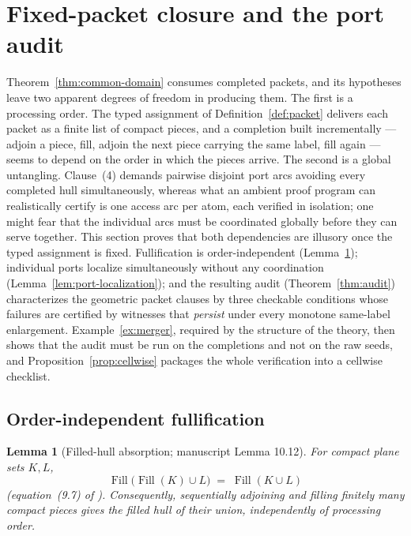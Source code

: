 \documentclass[11pt,reqno]{amsart}
\newtheorem{lemma}[theorem]{Lemma}
\theoremstyle{definition}
\theoremstyle{remark}
\newcommand{\Fill}{\operatorname{Fill}}
\begin{document}

\section{Fixed-packet closure and the port audit}\label{sec:audit}

Theorem~\ref{thm:common-domain} consumes completed packets, and its hypotheses leave
two apparent degrees of freedom in producing them. The first is a processing order.
The typed assignment of Definition~\ref{def:packet} delivers each packet as a finite
list of compact pieces, and a completion built incrementally --- adjoin a piece, fill,
adjoin the next piece carrying the same label, fill again --- seems to depend on the
order in which the pieces arrive. The second is a global untangling. Clause~(4)
demands pairwise disjoint port arcs avoiding every completed hull simultaneously,
whereas what an ambient proof program can realistically certify is one access arc per
atom, each verified in isolation; one might fear that the individual arcs must be
coordinated globally before they can serve together. This section proves that both
dependencies are illusory once the typed assignment is fixed. Fullification is
order-independent (Lemma~\ref{lem:fill-absorption}); individual ports localize
simultaneously without any coordination (Lemma~\ref{lem:port-localization}); and the
resulting audit (Theorem~\ref{thm:audit}) characterizes the geometric packet clauses
by three checkable conditions whose failures are certified by witnesses that
\emph{persist} under every monotone same-label enlargement.
Example~\ref{ex:merger}, required by the structure of the theory, then shows that the
audit must be run on the completions and not on the raw seeds, and
Proposition~\ref{prop:cellwise} packages the whole verification into a cellwise
checklist.

\subsection{Order-independent fullification}\label{subsec:E-fill-algebra}

\begin{lemma}[Filled-hull absorption; manuscript Lemma 10.12]\label{lem:fill-absorption}
For compact plane sets $K,L$,
\begin{equation}\label{eq:E-absorption}
\Fill\bigl(\Fill(K)\cup L\bigr)\;=\;\Fill(K\cup L)
\end{equation}
(equation~(9.7) of \cite{MWman}). Consequently, sequentially adjoining and filling
finitely many compact pieces gives the filled hull of their union, independently of
processing order.
\end{lemma}
\end{document}
